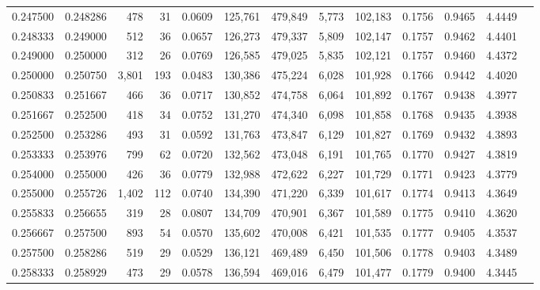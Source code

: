 \begin{tabular}{rrrrrrrrrrrrr}
0.247500 & 0.248286 &   478 &  31 &                                     0.0609 & 125,761 & 479,849 &   5,773 & 102,183 & 0.1756 & 0.9465 & 4.4449 \\
0.248333 & 0.249000 &   512 &  36 &                                     0.0657 & 126,273 & 479,337 &   5,809 & 102,147 & 0.1757 & 0.9462 & 4.4401 \\
0.249000 & 0.250000 &   312 &  26 &                                     0.0769 & 126,585 & 479,025 &   5,835 & 102,121 & 0.1757 & 0.9460 & 4.4372 \\
0.250000 & 0.250750 & 3,801 & 193 &                                     0.0483 & 130,386 & 475,224 &   6,028 & 101,928 & 0.1766 & 0.9442 & 4.4020 \\
0.250833 & 0.251667 &   466 &  36 &                                     0.0717 & 130,852 & 474,758 &   6,064 & 101,892 & 0.1767 & 0.9438 & 4.3977 \\
0.251667 & 0.252500 &   418 &  34 &                                     0.0752 & 131,270 & 474,340 &   6,098 & 101,858 & 0.1768 & 0.9435 & 4.3938 \\
0.252500 & 0.253286 &   493 &  31 &                                     0.0592 & 131,763 & 473,847 &   6,129 & 101,827 & 0.1769 & 0.9432 & 4.3893 \\
0.253333 & 0.253976 &   799 &  62 &                                     0.0720 & 132,562 & 473,048 &   6,191 & 101,765 & 0.1770 & 0.9427 & 4.3819 \\
0.254000 & 0.255000 &   426 &  36 &                                     0.0779 & 132,988 & 472,622 &   6,227 & 101,729 & 0.1771 & 0.9423 & 4.3779 \\
0.255000 & 0.255726 & 1,402 & 112 &                                     0.0740 & 134,390 & 471,220 &   6,339 & 101,617 & 0.1774 & 0.9413 & 4.3649 \\
0.255833 & 0.256655 &   319 &  28 &                                     0.0807 & 134,709 & 470,901 &   6,367 & 101,589 & 0.1775 & 0.9410 & 4.3620 \\
0.256667 & 0.257500 &   893 &  54 &                                     0.0570 & 135,602 & 470,008 &   6,421 & 101,535 & 0.1777 & 0.9405 & 4.3537 \\
0.257500 & 0.258286 &   519 &  29 &                                     0.0529 & 136,121 & 469,489 &   6,450 & 101,506 & 0.1778 & 0.9403 & 4.3489 \\
0.258333 & 0.258929 &   473 &  29 &                                     0.0578 & 136,594 & 469,016 &   6,479 & 101,477 & 0.1779 & 0.9400 & 4.3445 \\

\end{tabular}
